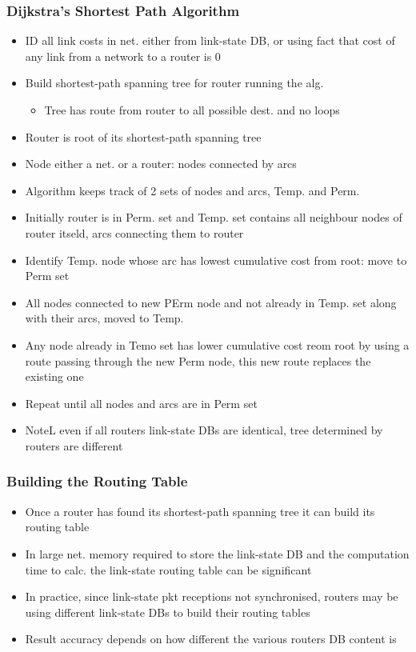 \documentclass[a4paper]{article}
\begin{document}
\subsubsection{Dijkstra's Shortest Path Algorithm}
\begin{itemize}
	\item ID all link costs in net. either from link-state DB, or using fact
		that cost of any link from a network to a router is 0
	\item Build shortest-path spanning tree for router running the alg.
	\begin{itemize}
		\item Tree has route from router to all possible dest. and no
			loops
	\end{itemize}
	\item Router is root of its shortest-path spanning tree
	\item Node either a net. or a router: nodes connected by arcs
	\item Algorithm keeps track of 2 sets of nodes and arcs, Temp. and Perm.
	\item Initially router is in Perm. set and Temp. set contains all
		neighbour nodes of router itseld, arcs connecting them to
		router
	\item Identify Temp. node whose arc has lowest cumulative cost from
		root: move to Perm set
	\item All nodes connected to new PErm node and not already in Temp. set
		along with their arcs, moved to Temp.
	\item Any node already in Temo set has lower cumulative cost reom root
		by using a route passing through the new Perm node, this new
		route replaces the existing one
	\item Repeat until all nodes and arcs are in Perm set
	\item NoteL even if all routers link-state DBs are identical, tree
		determined by routers are different
\end{itemize}
\subsubsection{Building the Routing Table}
\begin{itemize}
	\item Once a router has found its shortest-path spanning tree it can
		build its routing table
	\item In large net. memory required to store the link-state DB and the
		computation time to calc. the link-state routing table can be
		significant
	\item In practice, since link-state pkt receptions not synchronised,
		routers may be using different link-state DBs to build their
		routing tables
	\item Result accuracy depends on how different the various routers DB
		content is
\end{itemize}
\end{document}
